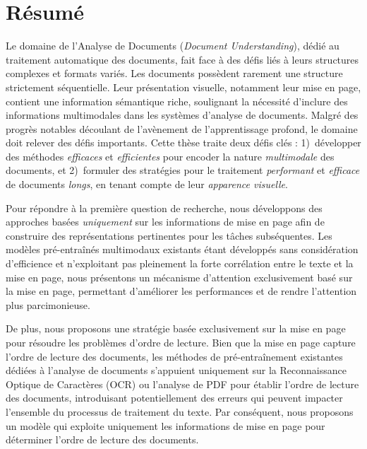 \cleardoublepage


\chapter{R\'esum\'e}


Le domaine de l'Analyse de Documents (\textit{Document Understanding}), dédié au traitement automatique des documents, fait face à des défis liés à leurs structures complexes et formats variés. Les documents possèdent rarement une structure strictement séquentielle. Leur présentation visuelle, notamment leur mise en page, contient une information sémantique riche, soulignant la nécessité d'inclure des informations multimodales dans les systèmes d'analyse de documents. Malgré des progrès notables découlant de l'avènement de l'apprentissage profond, le domaine doit relever des défis importants. Cette thèse traite deux défis clés : 1)~développer des méthodes \textit{efficaces} et \textit{efficientes} pour encoder la nature \textit{multimodale} des documents, et 2)~formuler des stratégies pour le traitement \textit{performant} et \textit{efficace} de documents \textit{longs}, en tenant compte de leur \textit{apparence visuelle}.

Pour répondre à la première question de recherche, nous développons des approches basées \textit{uniquement} sur les informations de mise en page afin de construire des représentations pertinentes pour les tâches subséquentes. Les modèles pré-entraînés multimodaux existants étant développés sans considération d'efficience et n'exploitant pas pleinement la forte corrélation entre le texte et la mise en page, nous présentons un mécanisme d'attention exclusivement basé sur la mise en page, permettant d'améliorer les performances et de rendre l'attention plus parcimonieuse.

De plus, nous proposons une stratégie basée exclusivement sur la mise en page pour résoudre les problèmes d'ordre de lecture. Bien que la mise en page capture l'ordre de lecture des documents, les méthodes de pré-entraînement existantes dédiées à l'analyse de documents s'appuient uniquement sur la Reconnaissance Optique de Caractères (OCR) ou l'analyse de PDF pour établir l'ordre de lecture des documents, introduisant potentiellement des erreurs qui peuvent impacter l'ensemble du processus de traitement du texte. Par conséquent, nous proposons un modèle qui exploite uniquement les informations de mise en page pour déterminer l'ordre de lecture des documents.

